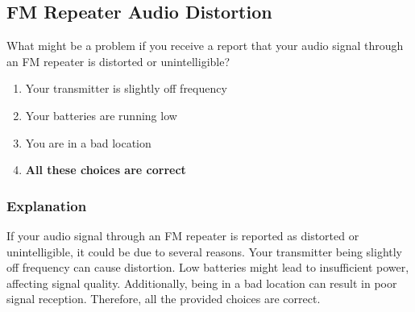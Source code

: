 \subsection{FM Repeater Audio Distortion}
\label{T7B10}

\begin{tcolorbox}[colback=gray!10!white,colframe=black!75!black,title=T7B10]
What might be a problem if you receive a report that your audio signal through an FM repeater is distorted or unintelligible?
\begin{enumerate}[noitemsep]
    \item Your transmitter is slightly off frequency
    \item Your batteries are running low
    \item You are in a bad location
    \item \textbf{All these choices are correct}
\end{enumerate}
\end{tcolorbox}

\subsubsection*{Explanation}
If your audio signal through an FM repeater is reported as distorted or unintelligible, it could be due to several reasons. Your transmitter being slightly off frequency can cause distortion. Low batteries might lead to insufficient power, affecting signal quality. Additionally, being in a bad location can result in poor signal reception. Therefore, all the provided choices are correct.